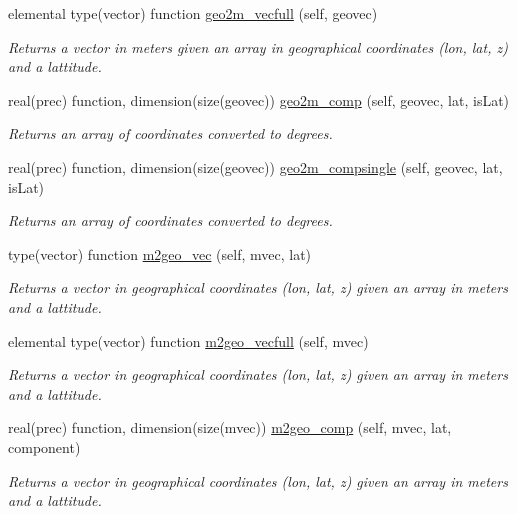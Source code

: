 \begin{DoxyCompactItemize}
elemental type(vector) function \mbox{\hyperlink{namespaceutilities__mod_ad0d629861220adba81d8622aa16f39ab}{geo2m\+\_\+vecfull}} (self, geovec)
\begin{DoxyCompactList}\small\item\em Returns a vector in meters given an array in geographical coordinates (lon, lat, z) and a lattitude. \end{DoxyCompactList}\item 
real(prec) function, dimension(size(geovec)) \mbox{\hyperlink{namespaceutilities__mod_a063ca10c2c57dc186ad0db0337fef4f9}{geo2m\+\_\+comp}} (self, geovec, lat, is\+Lat)
\begin{DoxyCompactList}\small\item\em Returns an array of coordinates converted to degrees. \end{DoxyCompactList}\item 
real(prec) function, dimension(size(geovec)) \mbox{\hyperlink{namespaceutilities__mod_a58dd5ed30b8ee9b9e1b43af96c119d28}{geo2m\+\_\+compsingle}} (self, geovec, lat, is\+Lat)
\begin{DoxyCompactList}\small\item\em Returns an array of coordinates converted to degrees. \end{DoxyCompactList}\item 
type(vector) function \mbox{\hyperlink{namespaceutilities__mod_a70b21b18c8633b7fd4c3057530d3f16f}{m2geo\+\_\+vec}} (self, mvec, lat)
\begin{DoxyCompactList}\small\item\em Returns a vector in geographical coordinates (lon, lat, z) given an array in meters and a lattitude. \end{DoxyCompactList}\item 
elemental type(vector) function \mbox{\hyperlink{namespaceutilities__mod_a0b374564c3672b029cc10d238bf77d4b}{m2geo\+\_\+vecfull}} (self, mvec)
\begin{DoxyCompactList}\small\item\em Returns a vector in geographical coordinates (lon, lat, z) given an array in meters and a lattitude. \end{DoxyCompactList}\item 
real(prec) function, dimension(size(mvec)) \mbox{\hyperlink{namespaceutilities__mod_ae6b8a45b229e3f1f8c2b12dd74e7a2dd}{m2geo\+\_\+comp}} (self, mvec, lat, component)
\begin{DoxyCompactList}\small\item\em Returns a vector in geographical coordinates (lon, lat, z) given an array in meters and a lattitude. \end{DoxyCompactList}\item 

\end{DoxyCompactItemize}

